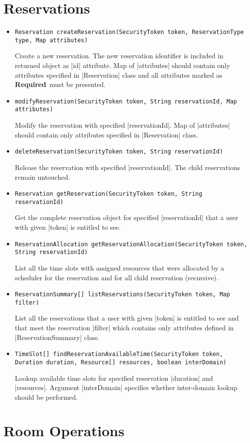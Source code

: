 \documentclass[a4paper]{report}
\newenvironment{Api}{\begin{itemize}}{\end{itemize}}
\newcommand{\ApiCode}[1]{\lstinline[style=styleApi]|#1|}
\newcommand{\ApiItem}[1]{\item #1 %

}
\newcommand{\ApiCmd}[1]{\ApiItem{\ApiCode{#1}}}
\newcommand{\ApiRequired}{{\color{blue!50!black}\textbf{Required}}}
\begin{document}
\section{Reservations}

\begin{Api}

\ApiCmd{Reservation createReservation(SecurityToken token, ReservationType type, Map attributes)}
Create a new reservation. The new reservation identifier is included in returned object as |id| attribute. Map of |attributes| should contain only attributes specified in |Reservation| class and all attributes marked as \ApiRequired\ must be presented.

\ApiCmd{modifyReservation(SecurityToken token, String reservationId, Map attributes)}
Modify the reservation with specified |reservationId|. Map of |attributes| should contain only attributes specified in |Reservation| class.

\ApiCmd{deleteReservation(SecurityToken token, String reservationId)}
Release the reservation with specified |reservationId|. The child reservations remain untouched.

\ApiCmd{Reservation getReservation(SecurityToken token, String reservationId)}
Get the complete reservation object for specified |reservationId| that a user with given |token| is entitled to see.

\ApiCmd{ReservationAllocation getReservationAllocation(SecurityToken token, String reservationId)}
List all the time slots with assigned resources that were allocated by a scheduler for the reservation and for all child reservation (recursive).

\ApiCmd{ReservationSummary[] listReservations(SecurityToken token, Map filter)}
List all the reservations that a user with given |token| is entitled to see and that meet the reservation |filter| which contains only attributes defined in |ReservationSummary| class.

\ApiCmd{TimeSlot[] findReservationAvailableTime(SecurityToken token, Duration duration, Resource[] resources, boolean interDomain)}
Lookup available time slots for specified reservation |duration| and |resources|. Argument |interDomain| specifies whether inter-domain lookup should be performed.

\end{Api}


\section{Room Operations}
\end{document}
